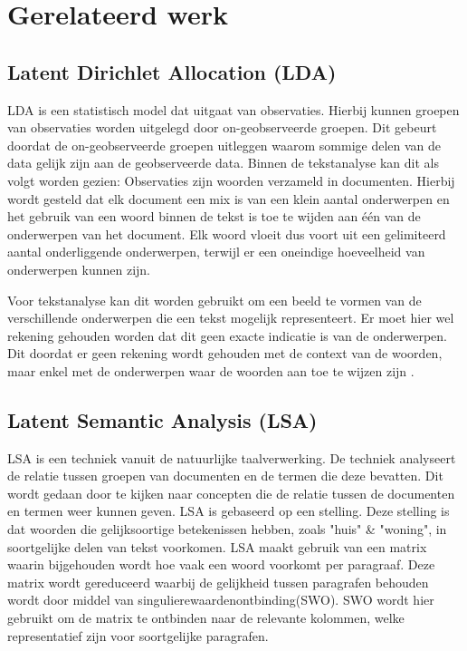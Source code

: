 \section{Gerelateerd werk}
\label{sec:rel}

\subsection{Latent Dirichlet Allocation (LDA)}
LDA is een statistisch model dat uitgaat van observaties. Hierbij kunnen groepen van observaties worden uitgelegd door on-geobserveerde groepen. Dit gebeurt doordat de on-geobserveerde groepen uitleggen waarom sommige delen van de data gelijk zijn aan de geobserveerde data. Binnen de tekstanalyse kan dit als volgt worden gezien: Observaties zijn woorden verzameld in documenten. Hierbij wordt gesteld dat elk document een mix is van een klein aantal onderwerpen en het gebruik van een woord binnen de tekst is toe te wijden aan één van de onderwerpen van het document. Elk woord vloeit dus voort uit een gelimiteerd aantal onderliggende onderwerpen, terwijl er een oneindige hoeveelheid van onderwerpen kunnen zijn. 

Voor tekstanalyse kan dit worden gebruikt om een beeld te vormen van de verschillende onderwerpen die een tekst mogelijk representeert. Er moet hier wel rekening gehouden worden dat dit geen exacte indicatie is van de onderwerpen. Dit doordat er geen rekening wordt gehouden met de context van de woorden, maar enkel met de onderwerpen waar de woorden aan toe te wijzen zijn \citep{blei2003latent}.

\subsection{Latent Semantic Analysis (LSA)}
LSA is een techniek vanuit de natuurlijke taalverwerking. De techniek analyseert de relatie tussen groepen van documenten en de termen die deze bevatten. Dit wordt gedaan door te kijken naar concepten die de relatie tussen de documenten en termen weer kunnen geven. LSA is gebaseerd op een stelling. Deze stelling is dat woorden die gelijksoortige betekenissen hebben, zoals "huis" \& "woning", in soortgelijke delen van tekst voorkomen. LSA maakt gebruik van een matrix waarin bijgehouden wordt hoe vaak een woord voorkomt per paragraaf. Deze matrix wordt gereduceerd waarbij de gelijkheid tussen paragrafen behouden wordt door middel van singulierewaardenontbinding(SWO). SWO wordt hier gebruikt om de matrix te ontbinden naar de relevante kolommen, welke representatief zijn voor soortgelijke paragrafen. 


